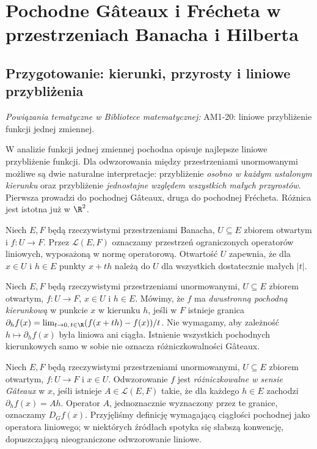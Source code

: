 \setcounter{section}{13}
\section{Pochodne Gâteaux i Frécheta w przestrzeniach Banacha i Hilberta}
\label{sec:gateaux-frechet14}

\providecommand{\atlasref}[2]{#2}


\subsection{Przygotowanie: kierunki, przyrosty i liniowe przybliżenia}

\noindent\emph{Powiązania tematyczne w Bibliotece matematycznej:} \atlasref{AM1-20::ma1:thm:linear-approximation}{AM1-20: liniowe przybliżenie funkcji jednej zmiennej}.


W analizie funkcji jednej zmiennej pochodna opisuje najlepsze liniowe przybliżenie funkcji. Dla odwzorowania między przestrzeniami unormowanymi możliwe są dwie naturalne interpretacje: przybliżenie \emph{osobno w każdym ustalonym kierunku} oraz przybliżenie \emph{jednostajne względem wszystkich małych przyrostów}. Pierwsza prowadzi do pochodnej Gâteaux, druga do pochodnej Frécheta. Różnica jest istotna już w $\R^2$.

Niech $E,F$ będą rzeczywistymi przestrzeniami Banacha, $U\subseteq E$ zbiorem otwartym i $f:U\to F$. Przez $\mathcal L(E,F)$ oznaczamy przestrzeń ograniczonych operatorów liniowych, wyposażoną w normę operatorową. Otwartość $U$ zapewnia, że dla $x\in U$ i $h\in E$ punkty $x+th$ należą do $U$ dla wszystkich dostatecznie małych $|t|$.

\begin{definicja}
\label{def:directional14}
Niech $E,F$ będą rzeczywistymi przestrzeniami unormowanymi,
$U\subseteq E$ zbiorem otwartym, $f:U\to F$, $x\in U$ i $h\in E$.
Mówimy, że $f$ ma \emph{dwustronną pochodną kierunkową} w punkcie $x$ w kierunku $h$, jeśli w $F$ istnieje granica
$\partial_h f(x)=\lim_{t\to0,\,t\in\R}(f(x+th)-f(x))/t$.
Nie wymagamy, aby zależność $h\mapsto\partial_h f(x)$ była liniowa ani ciągła. Istnienie wszystkich pochodnych kierunkowych samo w sobie nie oznacza różniczkowalności Gâteaux.
\end{definicja}

\begin{definicja}
\label{def:gateaux14}
Niech $E,F$ będą rzeczywistymi przestrzeniami unormowanymi,
$U\subseteq E$ zbiorem otwartym, $f:U\to F$ i $x\in U$.
Odwzorowanie $f$ jest \emph{różniczkowalne w sensie Gâteaux} w $x$, jeśli istnieje $A\in\mathcal L(E,F)$ takie, że dla każdego $h\in E$ zachodzi $\partial_h f(x)=Ah$. Operator $A$, jednoznacznie wyznaczony przez te granice, oznaczamy $D_Gf(x)$. Przyjęliśmy definicję wymagającą ciągłości pochodnej jako operatora liniowego; w niektórych źródłach spotyka się słabszą konwencję, dopuszczającą nieograniczone odwzorowanie liniowe.
\end{definicja}

